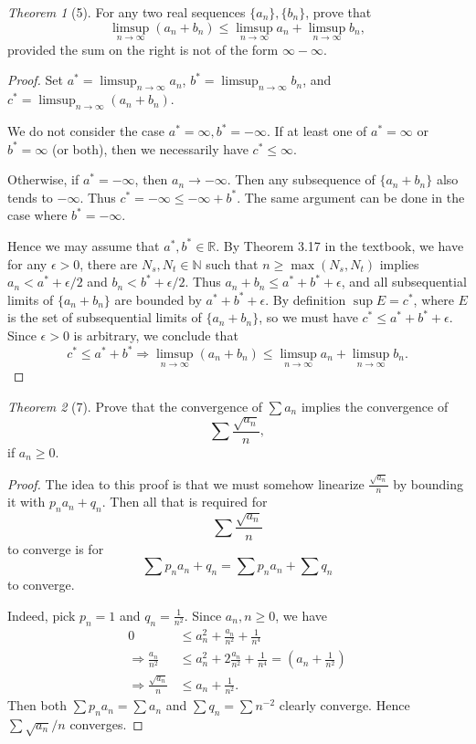 \documentclass[12pt]{article}
\theoremstyle{remark}
\theoremstyle{named}
\newtheorem*{theorem}{Theorem}
\renewcommand{\implies}{\Rightarrow}
\begin{document}
\begin{theorem}[5]
    For any two real sequences \(\{a_n\}, \{b_n\}\), prove that 
    \[\limsup_{n \to \infty} (a_n + b_n) \le \limsup_{n \to \infty} a_n + \limsup_{n \to \infty} b_n,\]
    provided the sum on the right is not of the form \(\infty - \infty\).
\end{theorem}

\begin{proof}
    Set \(a^* = \limsup_{n \to \infty} a_n\), \(b^* = \limsup_{n \to \infty} b_n\), and \(c^* = \limsup_{n \to \infty} (a_n + b_n)\).

    We do not consider the case \(a^* = \infty, b^* = -\infty\). If at least one of \(a^* = \infty\) or \(b^* = \infty\) (or both), then we necessarily have \(c^* \le \infty\). 
    
    Otherwise, if \(a^* = -\infty\), then \(a_n \to -\infty\). Then any subsequence of \(\{a_n + b_n\}\) also tends to \(-\infty\). Thus \(c^* = -\infty \le -\infty + b^*\). The same argument can be done in the case where \(b^* = -\infty\).

    Hence we may assume that \(a^*, b^* \in \mathbb R\). By Theorem 3.17 in the textbook, we have for any \(\epsilon > 0\), there are \(N_s, N_t \in \mathbb N\) such that \(n \ge \max(N_s, N_t)\) implies \(a_n < a^* + \epsilon/2\) and \(b_n < b^* + \epsilon/2\). 
    Thus \(a_n + b_n \le a^* + b^* + \epsilon\), and all subsequential limits of \(\{a_n + b_n\}\) are bounded by \(a^* + b^* + \epsilon\). 
    By definition \(\sup E = c^*\), where \(E\) is the set of subsequential limits of \(\{a_n + b_n\}\), so we must have \(c^* \le a^* + b^* + \epsilon\). Since \(\epsilon > 0\) is arbitrary, we conclude that 
    \[c^* \le a^* + b^* \implies \limsup_{n \to \infty} (a_n + b_n) \le \limsup_{n \to \infty} a_n + \limsup_{n \to \infty} b_n.\]
\end{proof}

\begin{theorem}[7]
    Prove that the convergence of \(\sum a_n\) implies the convergence of 
    \[\sum \frac{\sqrt{a_n}}{n},\]
    if \(a_n \ge 0\).
\end{theorem}

\begin{proof}
    The idea to this proof is that we must somehow linearize \(\frac{\sqrt{a_n}}{n}\) by bounding it with \(p_n a_n + q_n\). Then all that is required for \[\sum \frac{\sqrt{a_n}}{n}\] to converge is for 
    \[\sum p_n a_n + q_n = \sum p_n a_n + \sum q_n\] to converge. 

    Indeed, pick \(p_n = 1\) and \(q_n = \frac{1}{n^2}\). Since \(a_n, n \ge 0\), we have 
    \begin{align*}
        0 &\le a_n^2 + \frac{a_n}{n^2} + \frac{1}{n^4} \\
        \implies \frac{a_n}{n^2} &\le a_n^2 + 2\frac{a_n}{n^2} + \frac{1}{n^4} = \left(a_n + \frac{1}{n^2}\right) \\
        \implies \frac{\sqrt{a_n}}{n} &\le a_n + \frac{1}{n^2}.
    \end{align*}
    Then both \(\sum p_n a_n = \sum a_n\) and \(\sum q_n = \sum n^{-2}\) clearly converge. Hence \(\sum \sqrt{a_n}/n\) converges.
\end{proof}
\end{document}
